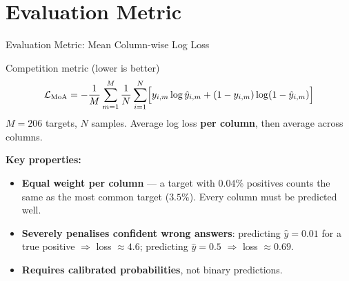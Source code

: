 \documentclass[aspectratio=169, 10pt]{beamer}
\begin{document}
\section{Evaluation Metric}

\begin{frame}{Evaluation Metric: Mean Column-wise Log Loss}
  \begin{block}{Competition metric (lower is better)}
    \[
      \mathcal{L}_{\text{MoA}} =
      -\frac{1}{M} \sum_{m=1}^{M}
      \frac{1}{N} \sum_{i=1}^{N}
      \Bigl[
        y_{i,m} \log \hat{y}_{i,m}
        + (1 - y_{i,m}) \log(1 - \hat{y}_{i,m})
      \Bigr]
    \]
    $M = 206$ targets, $N$ samples. Average log loss \textbf{per column}, then average across columns.
  \end{block}

  \vspace{0.4em}
  \textbf{Key properties:}
  \begin{itemize}
    \item \textbf{Equal weight per column} — a target with $0.04\%$ positives counts
          the same as the most common target ($3.5\%$). Every column must be predicted well.
    \item \textbf{Severely penalises confident wrong answers}:
          predicting $\hat{y} = 0.01$ for a true positive $\Rightarrow$ loss $\approx 4.6$;
          predicting $\hat{y} = 0.5$ $\Rightarrow$ loss $\approx 0.69$.
    \item \textbf{Requires calibrated probabilities}, not binary predictions.
  \end{itemize}
\end{frame}
\end{document}
